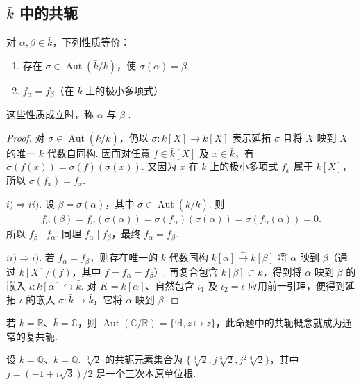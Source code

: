 \subsection{$\bar k$ 中的共轭}\label{sec:galois-2-3-2}
\begin{proposition*}
对 $\alpha,\beta\in\bar k$，下列性质等价：
\begin{enumerate}[label=\roman*)]
\item 存在 $\sigma\in\operatorname{Aut}(\bar k/k)$，使 $\sigma(\alpha)=\beta$.
\item $f_\alpha=f_\beta$（在 $k$ 上的极小多项式）.
\end{enumerate}
这些性质成立时，称 $\alpha$ 与 $\beta$ .
\end{proposition*}
\begin{proof}
对 $\sigma\in\operatorname{Aut}(\bar k/k)$，仍以 $\sigma:\bar k[X]\to\bar k[X]$ 表示延拓 $\sigma$ 且将 $X$ 映到 $X$ 的唯一 $k$ 代数自同构. 因而对任意 $f\in\bar k[X]$ 及 $x\in\bar k$，有 $\sigma(f(x))=\sigma(f)(\sigma(x))$. 又因为 $x$ 在 $k$ 上的极小多项式 $f_x$ 属于 $k[X]$，所以 $\sigma(f_x)=f_x$.

$i)\Rightarrow ii)$. 设 $\beta=\sigma(\alpha)$，其中 $\sigma\in\operatorname{Aut}(\bar k/k)$. 则
\begin{align*}
f_\alpha(\beta)=f_\alpha(\sigma(\alpha))=\sigma(f_\alpha)(\sigma(\alpha))=\sigma(f_\alpha(\alpha))=0.
\end{align*}
所以 $f_\beta\mid f_\alpha$. 同理 $f_\alpha\mid f_\beta$，最终 $f_\alpha=f_\beta$.

$ii)\Rightarrow i)$. 若 $f_\alpha=f_\beta$，则存在唯一的 $k$ 代数同构 $k[\alpha]\xrightarrow{\sim}k[\beta]$ 将 $\alpha$ 映到 $\beta$（通过 $k[X]/(f)$，其中 $f=f_\alpha=f_\beta$）. 再复合包含 $k[\beta]\subset\bar k$，得到将 $\alpha$ 映到 $\beta$ 的嵌入 $\iota:k[\alpha]\hookrightarrow\bar k$. 对 $K=k[\alpha]$、自然包含 $\iota_1$ 及 $\iota_2=\iota$ 应用前一引理，便得到延拓 $\iota$ 的嵌入 $\sigma:\bar k\to\bar k$，它将 $\alpha$ 映到 $\beta$.
\end{proof}
\begin{example*}
若 $k=\mathbb R$、$\bar k=\mathbb C$，则 $\operatorname{Aut}(\mathbb C/\mathbb R)=\{\mathrm{id},z\mapsto\bar z\}$，此命题中的共轭概念就成为通常的复共轭.
\end{example*}
\begin{example*}
设 $k=\mathbb Q$、$\bar k=\overline{\mathbb Q}$. $\sqrt[3]{2}$ 的共轭元素集合为 $\{\sqrt[3]{2},j\sqrt[3]{2},j^2\sqrt[3]{2}\}$，其中 $j=(-1+i\sqrt3)/2$ 是一个三次本原单位根.
\end{example*}
